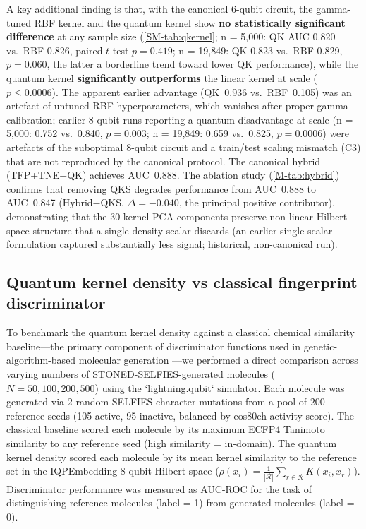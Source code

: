 \documentclass[11pt,a4paper]{article}
\begin{document}
A key additional finding is that, with the canonical 6-qubit circuit, the gamma-tuned RBF kernel and the quantum kernel show \textbf{no statistically significant difference} at any sample size (\cref{SM-tab:qkernel}; n = 5,000: QK AUC \num{0.820} vs.~RBF 0.826, paired $t$-test $p = 0.419$; n = 19,849: QK 0.823 vs.~RBF 0.829, $p = 0.060$, the latter a borderline trend toward lower QK performance), while the quantum kernel \textbf{significantly outperforms} the linear kernel at scale ($p \leq 0.0006$). The apparent earlier advantage (QK~0.936 vs.~RBF~0.105) was an artefact of untuned RBF hyperparameters, which vanishes after proper gamma calibration; earlier 8-qubit runs reporting a quantum disadvantage at scale (n = 5,000: 0.752 vs.\ 0.840, $p = 0.003$; n = 19,849: 0.659 vs.\ 0.825, $p = 0.0006$) were artefacts of the suboptimal 8-qubit circuit and a train/test scaling mismatch (C3) that are not reproduced by the canonical protocol. The canonical hybrid (TFP+TNE+QK) achieves AUC~0.888. The ablation study (\cref{M-tab:hybrid}) confirms that removing QKS degrades performance from AUC~0.888 to AUC~0.847 (Hybrid$-$QKS, $\Delta = -0.040$, the principal positive contributor), demonstrating that the 30 kernel PCA components preserve non-linear Hilbert-space structure that a single density scalar discards (an earlier single-scalar formulation captured substantially less signal; historical, non-canonical run).



\subsection{Quantum kernel density vs classical fingerprint discriminator}


To benchmark the quantum kernel density against a classical chemical similarity baseline---the primary component of discriminator functions used in genetic-algorithm-based molecular generation \citep{jensen2019augmenting}---we performed a direct comparison across varying numbers of STONED-SELFIES-generated molecules ($N = 50, 100, 200, 500$) using the `lightning.qubit` simulator. Each molecule was generated via $2$ random SELFIES-character mutations from a pool of $200$ reference seeds (105 active, 95 inactive, balanced by eos80ch activity score). The classical baseline scored each molecule by its maximum ECFP4 Tanimoto similarity to any reference seed (high similarity = in-domain). The quantum kernel density scored each molecule by its mean kernel similarity to the reference set in the IQPEmbedding 8-qubit Hilbert space ($\rho(x_i) = \frac{1}{|\mathcal{R}|}\sum_{r \in \mathcal{R}} K(x_i, x_r)$). Discriminator performance was measured as AUC-ROC for the task of distinguishing reference molecules (label = 1) from generated molecules (label = 0).
\end{document}
